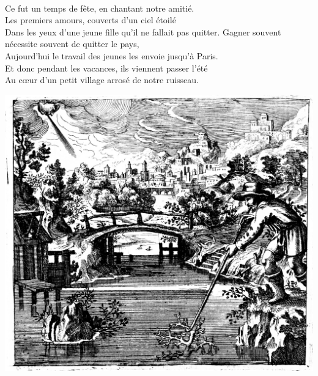 \\Ce fut un temps de fête, en chantant notre amitié.
\\Les premiers amours, couverts d'un ciel étoilé
\\Dans les yeux d'une jeune fille qu'il ne fallait pas quitter.
\breakpage
Gagner souvent nécessite souvent de quitter le pays,
\\Aujourd'hui le travail des jeunes les envoie jusqu'à Paris.
\\Et donc pendant les vacances, ils viennent passer l'été
\\Au cœur d'un petit village arrosé de notre ruisseau.

\vspace{1cm}
\begin{center}
\includegraphics[width=1\textwidth]{images/brev33.png}
\end{center}

\breakpage
